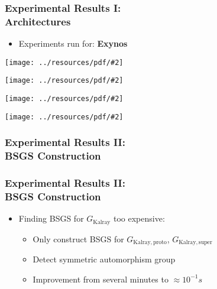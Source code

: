 \documentclass{beamer}
\newcommand{\includeressource}[2][]{\texttt{[image: ../resources/pdf/\#2]}}
\newcommand{\inputressource}[1]{}
\begin{document}
\begin{frame}
  \frametitle{Experimental Results I:\\Architectures}

  \begin{itemize}
    \item Experiments run for:
          \textbf<1>{Exynos}
  \end{itemize}

  \vspace{.25cm}

  \begin{overprint}
    \centerline{\includeressource[width=.4\textwidth]{exynos.pdf}}
    \centerline{\includeressource[width=.4\textwidth]{parallella.pdf}}
    \centerline{\includeressource[width=.5\textwidth]{HAEC.pdf}}
    \centerline{\includeressource[width=.8\textwidth]{Kalray.pdf}}
  \end{overprint}
\end{frame}

\begin{frame}
  \frametitle{Experimental Results II:\\BSGS Construction}

  \begin{figure}
    \centering
    \scalebox{.7}{\inputressource{bsgs_boxplot.tex}}
  \end{figure}
\end{frame}

\begin{frame}
  \frametitle{Experimental Results II:\\BSGS Construction}

  \begin{itemize}
    \item<1-> Finding BSGS for $G_{\mathrm{Kalray}}$ too expensive:
      \begin{itemize}
        \setlength\itemsep{.25cm}

        \item<2-> Only construct BSGS for $G_{\mathrm{Kalray,proto}}$,
                  $G_{\mathrm{Kalray,super}}$
        \item<3-> Detect symmetric automorphism group
        \item<4-> Improvement from several minutes to $\approx 10^{-1}s$
      \end{itemize}
  \end{itemize}
\end{frame}
\end{document}
